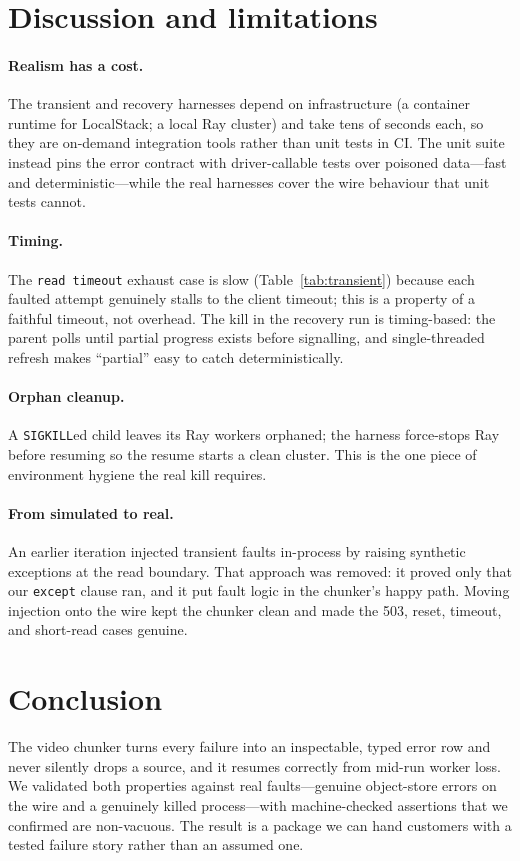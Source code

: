 \documentclass[11pt]{article}
\newcommand{\ct}[1]{\texttt{\small #1}}
\begin{document}
\section{Discussion and limitations}

\paragraph{Realism has a cost.} The transient and recovery harnesses depend on
infrastructure (a container runtime for LocalStack; a local Ray cluster) and take
tens of seconds each, so they are on-demand integration tools rather than unit
tests in CI. The unit suite instead pins the error contract with driver-callable
tests over poisoned data---fast and deterministic---while the real harnesses
cover the wire behaviour that unit tests cannot.

\paragraph{Timing.} The \ct{read timeout} exhaust case is slow (Table~\ref{tab:transient})
because each faulted attempt genuinely stalls to the client timeout; this is a
property of a faithful timeout, not overhead. The kill in the recovery run is
timing-based: the parent polls until partial progress exists before signalling,
and single-threaded refresh makes ``partial'' easy to catch deterministically.

\paragraph{Orphan cleanup.} A \ct{SIGKILL}ed child leaves its Ray workers
orphaned; the harness force-stops Ray before resuming so the resume starts a
clean cluster. This is the one piece of environment hygiene the real kill
requires.

\paragraph{From simulated to real.} An earlier iteration injected transient
faults in-process by raising synthetic exceptions at the read boundary. That
approach was removed: it proved only that our \ct{except} clause ran, and it put
fault logic in the chunker's happy path. Moving injection onto the wire kept the
chunker clean and made the 503, reset, timeout, and short-read cases genuine.

\section{Conclusion}

The video chunker turns every failure into an inspectable, typed error row and
never silently drops a source, and it resumes correctly from mid-run worker loss.
We validated both properties against real faults---genuine object-store errors on
the wire and a genuinely killed process---with machine-checked assertions that we
confirmed are non-vacuous. The result is a package we can hand customers with a
tested failure story rather than an assumed one.
\end{document}
